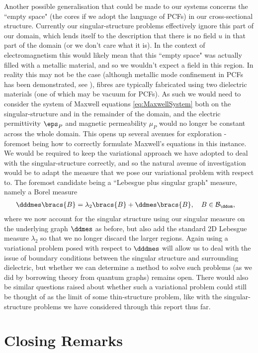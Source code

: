 Another possible generalisation that could be made to our systems concerns the ``empty space" (the cores if we adopt the language of PCFs) in our cross-sectional structure.
Currently our singular-structure problems effectively ignore this part of our domain, which lends itself to the description that there is no field $u$ in that part of the domain (or we don't care what it is).
In the context of electromagnetism this would likely mean that this ``empty space" was actually filled with a metallic material, and so we wouldn't expect a field in this region.
In reality this may not be the case (although metallic mode confinement in PCFs has been demonstrated, see \cite{hou2008metallic}), fibres are typically fabricated using two dielectric materials (one of which may be vacuum for PCFs).
As such we would need to consider the system of Maxwell equations \eqref{eq:MaxwellSystem} both on the singular-structure and in the remainder of the domain, and the electric permittivity $\eps_{P}$ and magnetic permeability $\mu_{P}$ would no longer be constant across the whole domain.
This opens up several avenues for exploration - foremost being how to correctly formulate Maxwell's equations in this instance.
We would be required to keep the variational approach we have adopted to deal with the singular-structure correctly, and so the natural avenue of investigation would be to adapt the measure that we pose our variational problem with respect to.
The foremost candidate being a ``Lebesgue plus singular graph" measure, namely a Borel measure
\begin{align*}
	\dddmes\bracs{B} &= \lambda_{2}\bracs{B} + \ddmes\bracs{B}, \quad B\in\mathcal{B}_{\ddom},
\end{align*}
where we now account for the singular structure using our singular measure on the underlying graph $\ddmes$ as before, but also add the standard 2D Lebesgue measure $\lambda_2$ so that we no longer discard the larger regions.
Again using a variational problem posed with respect to $\dddmes$ will allow us to deal with the issue of boundary conditions between the singular structure and surrounding dielectric, but whether we can determine a method to solve such problems (as we did by borrowing theory from quantum graphs) remains open.
There would also be similar questions raised about whether such a variational problem could still be thought of as the limit of some thin-structure problem, like with the singular-structure problems we have considered through this report thus far.

\section{Closing Remarks} \label{sec:ConcClosingRemarks}
